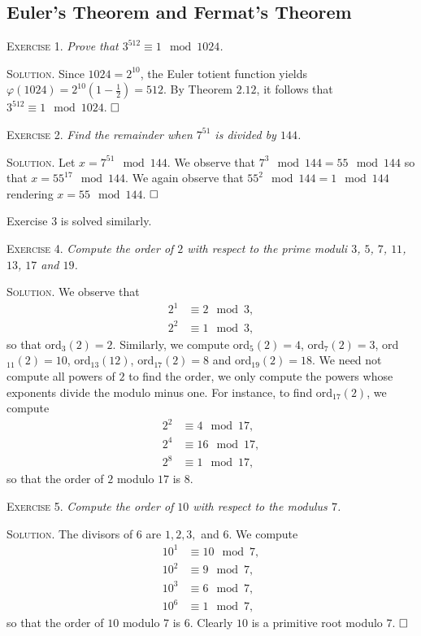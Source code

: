 \documentclass[11pt, leqno]{article}
\newcommand{\done}{\ensuremath{\hfill\square}}
\begin{document}
\subsection{Euler's Theorem and Fermat's Theorem}

\textsc{Exercise 1}. \emph{Prove that $3^{512}\equiv 1 \mod 1024$.}

\textsc{Solution}. Since $1024 = 2^{10}$, the Euler totient function yields $\displaystyle \varphi(1024) = 2^{10}\left( 1 - \frac{1}{2} \right) = 512$. By Theorem $2.12$, it follows that $3^{512} \equiv 1 \mod 1024$. \done

\textsc{Exercise 2}. \emph{Find the remainder when $7^{51}$ is divided by $144$.}

\textsc{Solution}. Let $x=7^{51} \mod 144$. We observe that $7^3\mod 144 = 55 \mod 144$ so that $x = 55^{17} \mod 144$. We again observe that $55^2 \mod 144 = 1\mod 144$ rendering $x = 55 \mod 144$. \done

Exercise 3 is solved similarly.

\textsc{Exercise 4}. \emph{Compute the order of $2$ with respect to the prime moduli $3$, $5$, $7$, $11$, $13$, $17$ and $19$.}

\textsc{Solution}. We observe that 
\begin{align*}
  2^1 &\equiv 2 \mod 3, \\
  2^2 &\equiv 1 \mod 3,
\end{align*}
so that ord$_3(2) = 2$. Similarly, we compute ord$_5(2) = 4$, ord$_7(2) = 3$, ord$_{11}(2) = 10$, ord$_{13}(12)$, ord$_{17}(2) = 8$ and ord$_{19}(2) = 18$. We need not compute all powers of $2$ to find the order, we only compute the powers whose exponents divide the modulo minus one. For instance, to find ord$_{17}(2)$, we compute 
\begin{align*}
  2^2 &\equiv 4 \mod 17, \\
  2^4 &\equiv 16 \mod 17, \\
  2^8 &\equiv 1 \mod 17,
\end{align*}
so that the order of $2$ modulo $17$ is $8$. 

\textsc{Exercise 5}. \emph{Compute the order of $10$ with respect to the modulus $7$.}

\textsc{Solution}. The divisors of $6$ are $1, 2, 3,$ and $6$. We compute 
\begin{align*}
  10^1 &\equiv 10 \mod 7, \\
  10^2 &\equiv 9 \mod 7, \\
  10^3 &\equiv 6 \mod 7, \\
  10^6 &\equiv 1 \mod 7,
\end{align*}
so that the order of $10$ modulo $7$ is $6$. Clearly $10$ is a primitive root modulo $7$. \done
\end{document}
